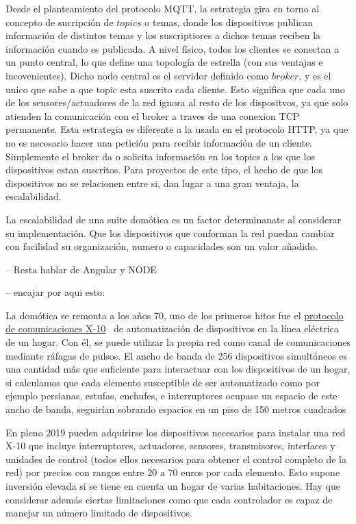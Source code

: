 Desde el planteamiento del protocolo MQTT, la estrategia gira en torno al concepto de sucripción de $topics$ o temas, donde los dispositivos publican información de distintos temas y los suscriptiores a dichos temas reciben la información cuando es publicada. A nivel físico, todos los clientes se conectan a un punto central, lo que define una topología de estrella (con sus ventajas e incovenientes). Dicho nodo central es el servidor definido como $broker$, y es el unico que sabe a que topic esta suscrito cada cliente. Esto significa que cada uno de los sensores/actuadores de la red ignora al resto de los dispositvos, ya que solo atienden la comunicación con el broker a traves de una conexion TCP permanente. Esta estrategia es diferente a la usada en el protocolo HTTP, ya que no es necesario hacer una petición para recibir información de un cliente. Simplemente el broker da o solicita información en los topics a los que los dispositivos estan suscritos. Para proyectos de este tipo, el hecho de que los dispositivos no se relacionen entre si, dan lugar a una gran ventaja, la escalabilidad.

\vspace{1.5cm}

La escalabilidad de una suite domótica es un factor determinanate al considerar su implementación. Que los dispositivos que conforman la red puedan cambiar con facilidad su organización, numero o capacidades son un valor añadido.

-- Resta hablar de Angular y NODE

-- encajar por aqui esto:

La domótica se remonta a los años 70, uno de los primeros hitos fue el \href{https://es.wikipedia.org/wiki/X10}{protocolo de comunicaciones X-10}~\cite{x10protocolwikipedia} de automatización de dispositivos en la línea eléctrica de un hogar. Con él, se puede utilizar la propia red como canal de comunicaciones mediante ráfagas de pulsos. El ancho de banda de 256 dispositivos simultáneos es una cantidad más que suficiente para interactuar con los dispositivos de un hogar, si calculamos que cada elemento susceptible de ser automatizado como por ejemplo persianas, estufas, enchufes, e interruptores ocupase un espacio de este ancho de banda, seguirían sobrando espacios en un piso de 150 metros cuadrados

\vspace{1.5cm}

En pleno 2019 pueden adquirirse los dispositivos necesarios para instalar una red X-10 que incluye interruptores, actuadores, sensores, transmisores, interfaces y unidades de control (todos ellos necesarios para obtener el control completo de la red) por precios con rangos entre 20 a 70 euros por cada elemento. Esto supone inversión elevada si se tiene en cuenta un hogar de varias habitaciones. Hay que considerar además ciertas limitaciones como que cada controlador es capaz de manejar un número limitado de dispositivos.

